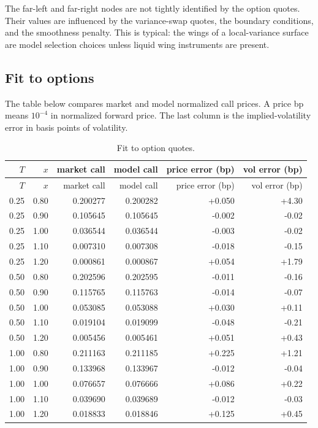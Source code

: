 \documentclass[11pt]{article}
\newcommand{\1}{\mathbf{1}}
\begin{document}
The far-left and far-right nodes are not tightly identified by the option quotes. Their
values are influenced by the variance-swap quotes, the boundary conditions, and the
smoothness penalty. This is typical: the wings of a local-variance surface are model
selection choices unless liquid wing instruments are present.

\subsection{Fit to options}

The table below compares market and model normalized call prices. A price bp means
$10^{-4}$ in normalized forward price. The last column is the implied-volatility error in
basis points of volatility.

\begin{longtable}{rrrrrr}
\caption{Fit to option quotes.}\label{tab:fit_options}\\
\toprule
$T$ & $x$ & market call & model call & price error (bp) & vol error (bp)\\
\midrule
\endfirsthead
\toprule
$T$ & $x$ & market call & model call & price error (bp) & vol error (bp)\\
\midrule
\endhead
0.25 & 0.80 & 0.200277 & 0.200282 & +0.050 & +4.30\\
0.25 & 0.90 & 0.105645 & 0.105645 & -0.002 & -0.02\\
0.25 & 1.00 & 0.036544 & 0.036544 & -0.003 & -0.02\\
0.25 & 1.10 & 0.007310 & 0.007308 & -0.018 & -0.15\\
0.25 & 1.20 & 0.000861 & 0.000867 & +0.054 & +1.79\\
0.50 & 0.80 & 0.202596 & 0.202595 & -0.011 & -0.16\\
0.50 & 0.90 & 0.115765 & 0.115763 & -0.014 & -0.07\\
0.50 & 1.00 & 0.053085 & 0.053088 & +0.030 & +0.11\\
0.50 & 1.10 & 0.019104 & 0.019099 & -0.048 & -0.21\\
0.50 & 1.20 & 0.005456 & 0.005461 & +0.051 & +0.43\\
1.00 & 0.80 & 0.211163 & 0.211185 & +0.225 & +1.21\\
1.00 & 0.90 & 0.133968 & 0.133967 & -0.012 & -0.04\\
1.00 & 1.00 & 0.076657 & 0.076666 & +0.086 & +0.22\\
1.00 & 1.10 & 0.039690 & 0.039689 & -0.012 & -0.03\\
1.00 & 1.20 & 0.018833 & 0.018846 & +0.125 & +0.45\\
\bottomrule
\end{longtable}
\end{document}

